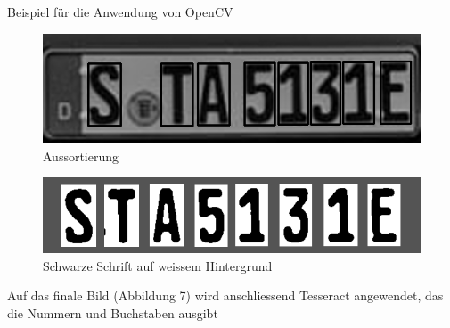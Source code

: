 \begin{frame}{Beispiel für die Anwendung von OpenCV}

\begin{figure}
\begin{center}
\includegraphics[scale=0.25]{bilder/Nummer_5_Aussortieren.png}
\caption{Aussortierung}
\label{Aussortierung}
\end{center}
\end{figure}

\begin{figure}
\begin{center}
\includegraphics[scale=0.25]{bilder/Nummer_6_SchwarzWeiss.png}
\caption{Schwarze Schrift auf weissem Hintergrund}
\label{SchwarzWeiss}
\end{center}
\end{figure}

Auf das finale Bild (Abbildung 7) wird anschliessend Tesseract angewendet, das die Nummern und Buchstaben ausgibt
\end{frame}